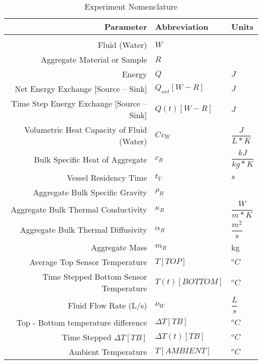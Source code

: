 \documentclass[a4paper,10pt]{scrbook}
\begin{document}
\begin{table}[t]
\begin{large}\caption{Experiment Nomenclature}\end{large}
\label{simNom}
\centering
\begin{tabular}{r l l}
Parameter & Abbreviation & Units\\
\hline
\\[-.5ex]
Fluid (Water)					&	$W$\\[3mm]

Aggregate Material or Sample			& 	$R$\\[3mm]

Energy						&	$Q$			& $J$\\[3mm]

Net Energy Exchange [Source -- Sink]		&	$Q_{net}[W-R]$		& $J$\\[3mm]

Time Step Energy Exchange [Source -- Sink]	&	$Q(t)[W-R]$		& $J$\\[3mm]

Volumetric Heat Capacity of Fluid (Water)	&	$Cv_{W}$		& $\dfrac{J}{L*K}$\\[3mm]

Bulk Specific Heat of Aggregate			&	$c_{R}$			& $\dfrac{kJ}{kg*K}$\\[3mm]

Vessel Residency Time 				&	$t_{V}$			& $s$\\[3mm]

Aggregate Bulk Specific Gravity			&	$\rho_{R}$		&\\[3mm]

Aggregate Bulk Thermal Conductivity		&	$\kappa_{R}$		& $\dfrac{W}{m*K}$\\[3mm]

Aggregate Bulk Thermal Diffusivity		&	$\alpha_{R}$		& $\dfrac{m^{2}}{s}$\\[3mm]

Aggregate Mass					&	$m_{R}$			& kg\\[3mm]

Average Top Sensor Temperature 			&	$T[TOP]$		& $^{o}C$\\[3mm]

Time Stepped Bottom Sensor Temperature 		&	$T(t)[BOTTOM]$		& $^{o}C$\\[3mm]	

Fluid Flow Rate (L/s)				&	$\nu_{W}$		& $\dfrac{L}{s}$\\[3mm]

Top - Bottom temperature difference 		&	$\Delta T[TB]$		& $^{o}C$\\[3mm]

Time Stepped $\Delta T[TB]$ 			&	$\Delta T(t)[TB]$	& $^{o}C$\\[3mm]

Ambient Temperature				&	$T[AMBIENT]$		& $^{o}C$\\[3mm]

\hline
\end{tabular}
\end{table} 
\end{document}
